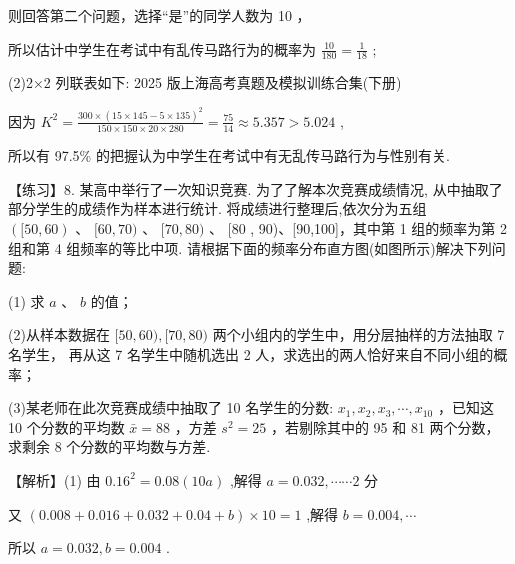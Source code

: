 \documentclass[10pt]{article}
\begin{document}
则回答第二个问题，选择“是”的同学人数为 10 ，

所以估计中学生在考试中有乱传马路行为的概率为 \(\frac{10}{180} = \frac{1}{18}\) ;

(2)2×2 列联表如下: 2025 版上海高考真题及模拟训练合集(下册)

\begin{center}
\end{center}

因为 \({K}^{2} = \frac{{300} \times  {\left( {15} \times  {145} - 5 \times  {135}\right) }^{2}}{{150} \times  {150} \times  {20} \times  {280}} = \frac{75}{14} \approx  {5.357} > {5.024}\) ,

所以有 97.5\% 的把握认为中学生在考试中有无乱传马路行为与性别有关.

【练习】8. 某高中举行了一次知识竞赛. 为了了解本次竞赛成绩情况, 从中抽取了部分学生的成绩作为样本进行统计. 将成绩进行整理后,依次分为五组 \(\left( {\lbrack {50},{60}}\right) \text{ 、 }\lbrack {60},{70})\text{ 、 }\lbrack {70},{80})\text{ 、 }\lbrack {80}\) , 90)、[90,100]，其中第 1 组的频率为第 2 组和第 4 组频率的等比中项. 请根据下面的频率分布直方图(如图所示)解决下列问题:

(1) 求 \(a\) 、 \(b\) 的值；

(2)从样本数据在 \(\lbrack {50},{60}),\lbrack {70},{80})\) 两个小组内的学生中，用分层抽样的方法抽取 7 名学生， 再从这 7 名学生中随机选出 2 人，求选出的两人恰好来自不同小组的概率；

(3)某老师在此次竞赛成绩中抽取了 10 名学生的分数: \({x}_{1},{x}_{2},{x}_{3},\cdots ,{x}_{10}\) ，已知这 10 个分数的平均数 \(\bar{x} = {88}\) ，方差 \({s}^{2} = {25}\) ，若剔除其中的 95 和 81 两个分数，求剩余 8 个分数的平均数与方差.

【解析】(1) 由 \({0.16}^{2} = {0.08}\left( {10a}\right)\) ,解得 \(a = {0.032},\cdots \cdots 2\) 分

又 \(\left( {{0.008} + {0.016} + {0.032} + {0.04} + b}\right)  \times  {10} = 1\) ,解得 \(b = {0.004},\cdots\)

所以 \(a = {0.032},b = {0.004}\) .
\end{document}
